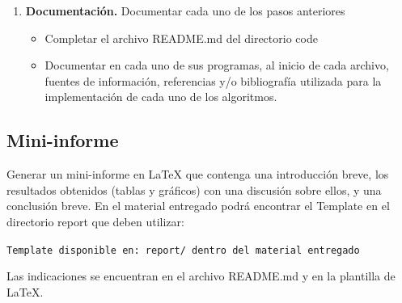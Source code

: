 \documentclass[11pt,spanish]{article}
\begin{document}
\begin{enumerate}[(1)]
  \item \textbf{Documentación.} Documentar cada uno de los pasos anteriores
  \begin{itemize}
    \item Completar el archivo README.md del directorio code
    \item Documentar en cada uno de sus programas, al inicio de cada archivo, fuentes de información, referencias y/o bibliografía utilizada para la implementación de cada uno de los algoritmos.
  \end{itemize}
\end{enumerate}

\newpage

\subsection{Mini-informe}\label{subsec:mini-informe}
Generar un mini-informe en \LaTeX{} que contenga una introducción breve, los resultados obtenidos (tablas y gráficos) con una discusión sobre ellos, y una conclusión breve. En el material entregado podrá encontrar el Template en el directorio report que deben utilizar:

\begin{center}
  \verb|Template disponible en: report/ dentro del material entregado|
\end{center}

Las indicaciones se encuentran en el archivo README.md y en la plantilla de \LaTeX{}.
\end{document}
